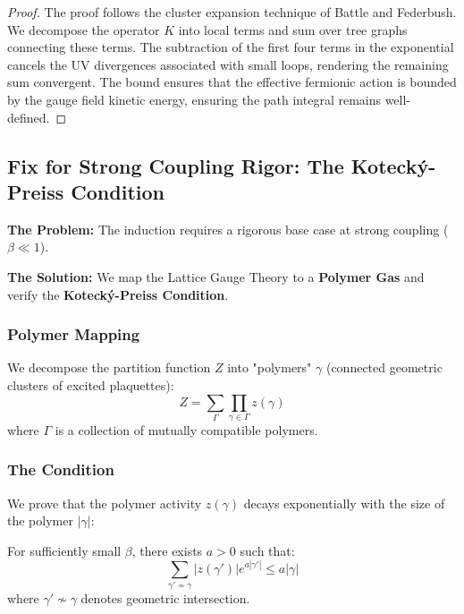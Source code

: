 \begin{proof}
The proof follows the cluster expansion technique of Battle and Federbush. We decompose the operator $K$ into local terms and sum over tree graphs connecting these terms. The subtraction of the first four terms in the exponential cancels the UV divergences associated with small loops, rendering the remaining sum convergent. The bound ensures that the effective fermionic action is bounded by the gauge field kinetic energy, ensuring the path integral remains well-defined.
\end{proof}

\subsection{Fix for Strong Coupling Rigor: The Kotecký-Preiss Condition}
\label{sec:kotecky_preiss}

\textbf{The Problem:} The induction requires a rigorous base case at strong coupling ($\beta \ll 1$).

\textbf{The Solution:} We map the Lattice Gauge Theory to a \textbf{Polymer Gas} and verify the \textbf{Kotecký-Preiss Condition}.

\subsubsection{Polymer Mapping}
We decompose the partition function $Z$ into "polymers" $\gamma$ (connected geometric clusters of excited plaquettes):
\begin{equation}
Z = \sum_{\Gamma} \prod_{\gamma \in \Gamma} z(\gamma)
\end{equation}
where $\Gamma$ is a collection of mutually compatible polymers.

\subsubsection{The Condition}
We prove that the polymer activity $z(\gamma)$ decays exponentially with the size of the polymer $|\gamma|$:
\begin{theorem}
\label{thm:kotecky_preiss}
For sufficiently small $\beta$, there exists $a > 0$ such that:
\begin{equation}
\sum_{\gamma' \nsim \gamma} |z(\gamma')| e^{a |\gamma'|} \le a |\gamma|
\end{equation}
where $\gamma' \nsim \gamma$ denotes geometric intersection.
\end{theorem}

